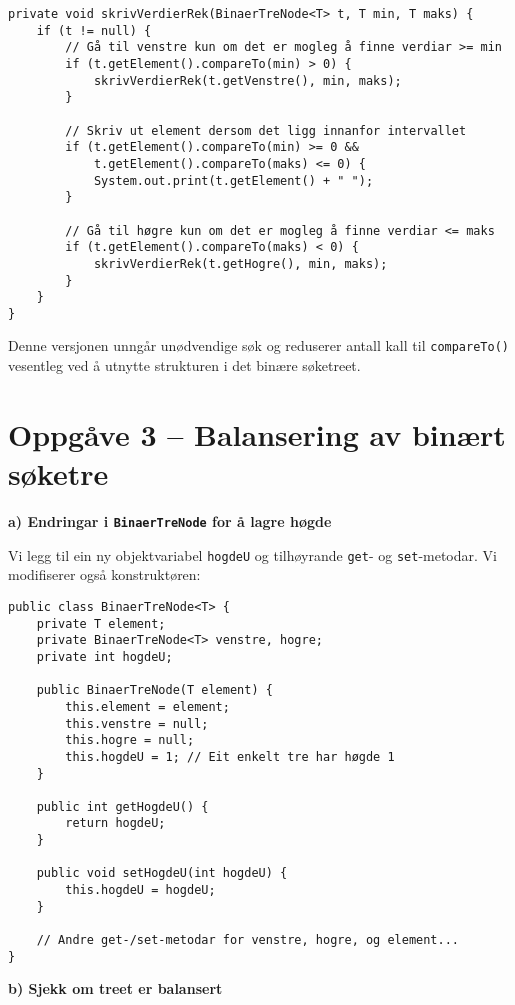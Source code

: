 \documentclass[12pt]{article}
\begin{document}
\begin{verbatim}
private void skrivVerdierRek(BinaerTreNode<T> t, T min, T maks) {
    if (t != null) {
        // Gå til venstre kun om det er mogleg å finne verdiar >= min
        if (t.getElement().compareTo(min) > 0) {
            skrivVerdierRek(t.getVenstre(), min, maks);
        }

        // Skriv ut element dersom det ligg innanfor intervallet
        if (t.getElement().compareTo(min) >= 0 &&
            t.getElement().compareTo(maks) <= 0) {
            System.out.print(t.getElement() + " ");
        }

        // Gå til høgre kun om det er mogleg å finne verdiar <= maks
        if (t.getElement().compareTo(maks) < 0) {
            skrivVerdierRek(t.getHogre(), min, maks);
        }
    }
}
\end{verbatim}

\noindent
Denne versjonen unngår unødvendige søk og reduserer antall kall til 
\texttt{compareTo()} vesentleg ved å utnytte strukturen i det binære søketreet.

\break
\section*{Oppgåve 3 – Balansering av binært søketre}

\noindent
\textbf{a) Endringar i \texttt{BinaerTreNode} for å lagre høgde}

\noindent
Vi legg til ein ny objektvariabel \texttt{hogdeU} og tilhøyrande \texttt{get}- og \texttt{set}-metodar. Vi modifiserer også konstruktøren:

{\small
\begin{verbatim}
public class BinaerTreNode<T> {
    private T element;
    private BinaerTreNode<T> venstre, hogre;
    private int hogdeU;

    public BinaerTreNode(T element) {
        this.element = element;
        this.venstre = null;
        this.hogre = null;
        this.hogdeU = 1; // Eit enkelt tre har høgde 1
    }

    public int getHogdeU() {
        return hogdeU;
    }

    public void setHogdeU(int hogdeU) {
        this.hogdeU = hogdeU;
    }

    // Andre get-/set-metodar for venstre, hogre, og element...
}
\end{verbatim}
}

\noindent
\textbf{b) Sjekk om treet er balansert}
\end{document}

